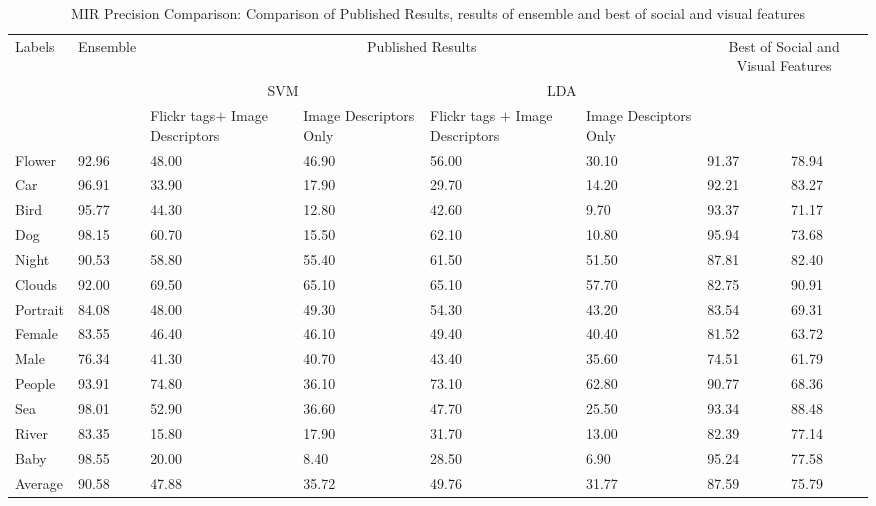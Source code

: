 \begin{table}
\centering
\caption{MIR Precision Comparison: Comparison of Published Results, results of ensemble and best of social and visual features} %
\vspace*{0.2 cm}
\begin{tabular}{| p{1 cm}| p{1.8 cm}| p{2.3 cm} | p{2.3 cm}| p{2.3 cm}| p{2.3 cm}| p{1.8 cm}| p{1.2 cm}|} \hline
 \multirow{3}{*}{Labels} &\multirow{3}{*}{Ensemble} & \multicolumn{4}{|c|}{Published Results} & \multicolumn{2}{|c|}{Best of Social and Visual Features} \\ \cline{3-8}
 & & \multicolumn{2}{|c|}{SVM} & \multicolumn{2}{|c|}{LDA} & {\multirow{2}{*}{Social}} & {\multirow{2}{*}{Visual}}\\ \cline{3-6}
 & & Flickr tags$+$ Image Descriptors & Image Descriptors Only & Flickr tags $+$ Image Descriptors & Image Desciptors Only & & \\ \hline
Flower & 92.96 & 48.00 & 46.90 & 56.00 & 30.10 & 91.37 & 78.94 \\  [1ex] \hline
Car & 96.91 & 33.90 & 17.90 & 29.70 & 14.20 & 92.21   & 83.27 \\  [1ex] \hline
Bird & 95.77 & 44.30 & 12.80 & 42.60 & 9.70 & 93.37  &  71.17 \\  [1ex] \hline
Dog & 98.15 &60.70 & 15.50 & 62.10 & 10.80 & 95.94  & 73.68  \\  [1ex] \hline
Night & 90.53 & 58.80 & 55.40 & 61.50 & 51.50 & 87.81 & 82.40 \\  [1ex] \hline
Clouds & 92.00 & 69.50 & 65.10 & 65.10 & 57.70 & 82.75 & 90.91 \\  [1ex] \hline
Portrait & 84.08 & 48.00 & 49.30 & 54.30 & 43.20 & 83.54 & 69.31 \\  [1ex] \hline
Female & 83.55 & 46.40 & 46.10 & 49.40 & 40.40 & 81.52 & 63.72 \\  [1ex] \hline
Male & 76.34 & 41.30 & 40.70 & 43.40 & 35.60 & 74.51 & 61.79 \\  [1ex] \hline
People & 93.91 & 74.80 & 36.10 & 73.10 & 62.80 & 90.77 & 68.36 \\  [1ex] \hline
Sea & 98.01 & 52.90 & 36.60 & 47.70 & 25.50 & 93.34 & 88.48 \\  [1ex] \hline
River & 83.35 & 15.80 & 17.90 & 31.70 & 13.00 & 82.39 & 77.14 \\  [1ex] \hline
Baby & 98.55 & 20.00 & 8.40 & 28.50 & 6.90 & 95.24 & 77.58 \\  [1ex] \hline
Average & 90.58 & 47.88 & 35.72 & 49.76 & 31.77 & 87.59 & 75.79 \\  [1ex] \hline
\end{tabular}
\label{MIRPrecisionOverAll} %
\end{table}


